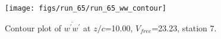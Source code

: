\begin{figure}[H]
\centering
\texttt{[image: figs/run\_65/run\_65\_ww\_contour]}
\caption{Contour plot of $\overline{w^\prime w^\prime}$ at $z/c$=10.00, $V_{free}$=23.23, station 7.}
\label{fig:run_65_ww_contour}
\end{figure}


